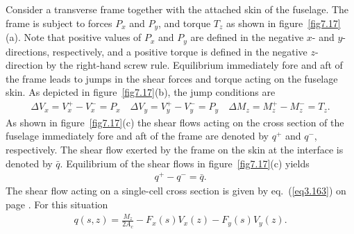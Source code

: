 \documentclass{AeroStructure-ERJohnson}
\begin{document}
Consider a transverse frame together with the attached skin of the fuselage. The frame is subject to forces $P_{x}$ and $P_{y}$, and torque $T_{z}$ as shown in figure~\ref{fig7.17}(a). Note that positive values of $P_{x}$ and $P_{y}$ are defined in the negative $x$- and $y$-directions, respectively, and a positive torque is defined in the negative $z$-direction by the right-hand screw rule. Equilibrium immediately fore and aft of the frame leads to jumps in the shear forces and torque acting on the fuselage skin. As depicted in figure~\ref{fig7.17}(b), the jump conditions are
\begin{align}\label{eq7.41}
\Delta V_{x}=V_{x}^{+}-V_{x}^{-}=P_{x} \quad \Delta V_{y}=V_{y}^{+}-V_{y}^{-}=P_{y} \quad \Delta M_{z}=M_{z}^{+}-M_{z}^{-}=T_{z}.
\end{align}
As shown in figure~\ref{fig7.17}(c) the shear flows acting on the cross section of the fuselage immediately fore and aft of the frame are denoted by $q^{+}$ and $q^{-}$, respectively. The shear flow exerted by the frame on the skin at the interface is denoted by $\bar{q}$. Equilibrium of the shear flows in figure~\ref{fig7.17}(c) yields
\begin{align}\label{eq7.42}
q^{+}-q^{-}=\bar{q}.
\end{align}
The shear flow acting on a single-cell cross section is given by eq.~(\ref{eq3.163}) on page \pageref{eq3.163}. For this situation
\begin{align}\label{eq7.43}
q(s, z)=\frac{M_{z}}{2 A_{c}}-F_{x}(s) V_{x}(z)-F_{y}(s) V_{y}(z).
\end{align}

\vspace*{-1pc}
\end{document}
